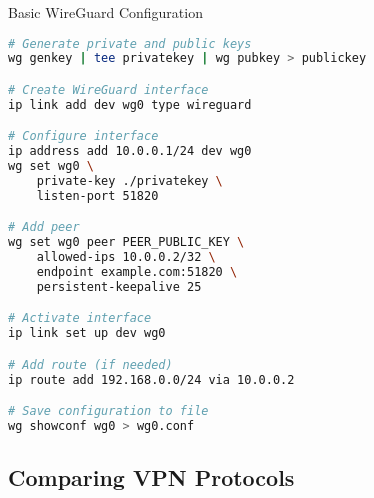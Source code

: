 \begin{examplecode}{Basic WireGuard Configuration}\\
\begin{lstlisting}[language=bash, style=basesmol]
# Generate private and public keys
wg genkey | tee privatekey | wg pubkey > publickey

# Create WireGuard interface
ip link add dev wg0 type wireguard

# Configure interface
ip address add 10.0.0.1/24 dev wg0
wg set wg0 \
    private-key ./privatekey \
    listen-port 51820

# Add peer
wg set wg0 peer PEER_PUBLIC_KEY \
    allowed-ips 10.0.0.2/32 \
    endpoint example.com:51820 \
    persistent-keepalive 25

# Activate interface
ip link set up dev wg0

# Add route (if needed)
ip route add 192.168.0.0/24 via 10.0.0.2

# Save configuration to file
wg showconf wg0 > wg0.conf
\end{lstlisting}
\end{examplecode}

\subsection{Comparing VPN Protocols}

